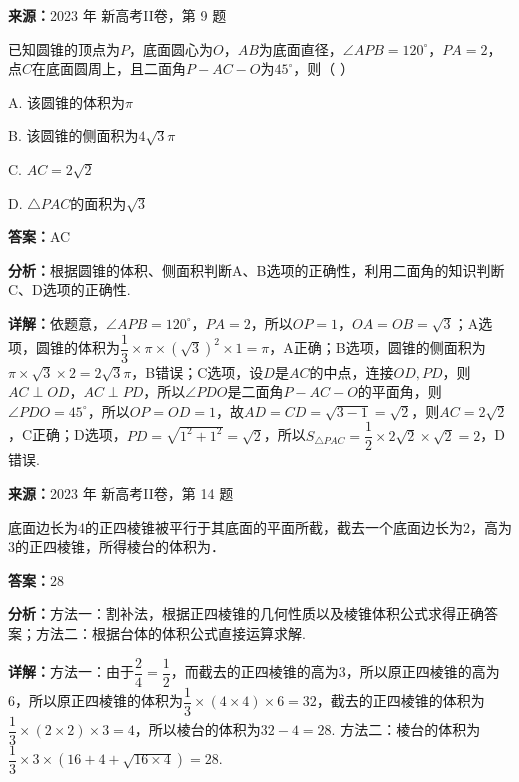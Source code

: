 \begin{question}[points=5]
\textbf{来源：}2023 年 新高考II卷，第 9 题\par
已知圆锥的顶点为$P$，底面圆心为$O$，$AB$为底面直径，$\angle APB=120^{\circ}$，$PA=2$，点$C$在底面圆周上，且二面角$P-AC-O$为$45^{\circ}$，则（ \quad ）
\begin{choices}
  \item A. 该圆锥的体积为$\pi$
  \item B. 该圆锥的侧面积为$4\sqrt{3}\pi$
  \item C. $AC=2\sqrt{2}$
  \item D. $\triangle PAC$的面积为$\sqrt{3}$
\end{choices}
\begin{solution}
\textbf{答案：}AC

\textbf{分析：}根据圆锥的体积、侧面积判断A、B选项的正确性，利用二面角的知识判断C、D选项的正确性.

\textbf{详解：}依题意，$\angle APB=120^{\circ}$，$PA=2$，所以$OP=1$，$OA=OB=\sqrt{3}$；A选项，圆锥的体积为$\dfrac{1}{3}\times\pi\times(\sqrt{3})^{2}\times1=\pi$，A正确；B选项，圆锥的侧面积为$\pi\times\sqrt{3}\times2=2\sqrt{3}\pi$，B错误；C选项，设$D$是$AC$的中点，连接$OD,PD$，则$AC\perp OD$，$AC\perp PD$，所以$\angle PDO$是二面角$P-AC-O$的平面角，则$\angle PDO=45^{\circ}$，所以$OP=OD=1$，故$AD=CD=\sqrt{3-1}=\sqrt{2}$，则$AC=2\sqrt{2}$，C正确；D选项，$PD=\sqrt{1^{2}+1^{2}}=\sqrt{2}$，所以$S_{\triangle PAC}=\dfrac{1}{2}\times2\sqrt{2}\times\sqrt{2}=2$，D错误.
\end{solution}
\end{question}

\begin{question}[points=5]
\textbf{来源：}2023 年 新高考II卷，第 14 题\par
底面边长为4的正四棱锥被平行于其底面的平面所截，截去一个底面边长为2，高为3的正四棱锥，所得棱台的体积为．
\fillin[{$28$}]
\begin{solution}
\textbf{答案：}$28$

\textbf{分析：}方法一：割补法，根据正四棱锥的几何性质以及棱锥体积公式求得正确答案；方法二：根据台体的体积公式直接运算求解.

\textbf{详解：}方法一：由于$\dfrac{2}{4}=\dfrac{1}{2}$，而截去的正四棱锥的高为3，所以原正四棱锥的高为6，所以原正四棱锥的体积为$\dfrac{1}{3}\times(4\times4)\times6=32$，截去的正四棱锥的体积为$\dfrac{1}{3}\times(2\times2)\times3=4$，所以棱台的体积为$32-4=28$.
方法二：棱台的体积为$\dfrac{1}{3}\times3\times(16+4+\sqrt{16\times4})=28$.
\end{solution}
\end{question}

